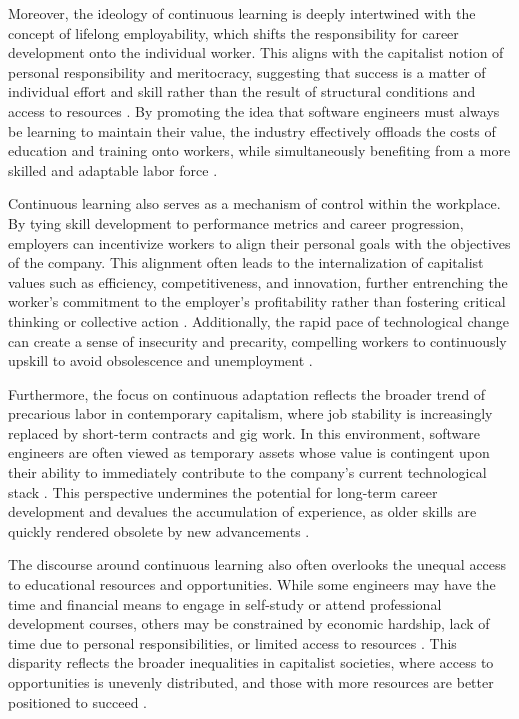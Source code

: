 \begin{refsection}
Moreover, the ideology of continuous learning is deeply intertwined with the concept of lifelong employability, which shifts the responsibility for career development onto the individual worker. This aligns with the capitalist notion of personal responsibility and meritocracy, suggesting that success is a matter of individual effort and skill rather than the result of structural conditions and access to resources \cite[pp.~96-99]{engels1987condition}. By promoting the idea that software engineers must always be learning to maintain their value, the industry effectively offloads the costs of education and training onto workers, while simultaneously benefiting from a more skilled and adaptable labor force \cite[pp.~482-485]{marx2008capital}.

Continuous learning also serves as a mechanism of control within the workplace. By tying skill development to performance metrics and career progression, employers can incentivize workers to align their personal goals with the objectives of the company. This alignment often leads to the internalization of capitalist values such as efficiency, competitiveness, and innovation, further entrenching the worker's commitment to the employer's profitability rather than fostering critical thinking or collective action \cite[pp.~118-122]{braverman1974labor}. Additionally, the rapid pace of technological change can create a sense of insecurity and precarity, compelling workers to continuously upskill to avoid obsolescence and unemployment \cite[pp.~286-289]{marx2008capital}.

Furthermore, the focus on continuous adaptation reflects the broader trend of precarious labor in contemporary capitalism, where job stability is increasingly replaced by short-term contracts and gig work. In this environment, software engineers are often viewed as temporary assets whose value is contingent upon their ability to immediately contribute to the company’s current technological stack \cite[pp.~154-157]{engels1987condition}. This perspective undermines the potential for long-term career development and devalues the accumulation of experience, as older skills are quickly rendered obsolete by new advancements \cite[pp.~35-39]{braverman1974labor}.

The discourse around continuous learning also often overlooks the unequal access to educational resources and opportunities. While some engineers may have the time and financial means to engage in self-study or attend professional development courses, others may be constrained by economic hardship, lack of time due to personal responsibilities, or limited access to resources \cite[pp.~94-97]{braverman1974labor}. This disparity reflects the broader inequalities in capitalist societies, where access to opportunities is unevenly distributed, and those with more resources are better positioned to succeed \cite[pp.~74-78]{marx2008capital}.


\end{refsection}
